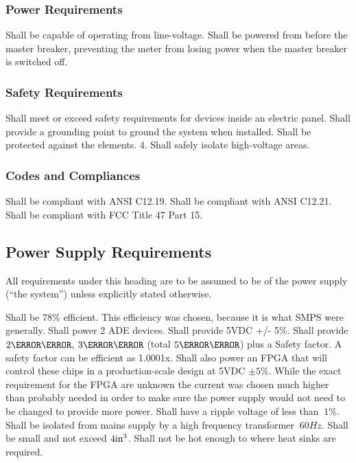 \subsubsection{Power Requirements}
\begin{outline}[enumerate]
\1 Shall be capable of operating from line-voltage.
\1 Shall be powered from before the master breaker, preventing the meter from losing power when the master breaker is switched off.
\end{outline}

\subsubsection{Safety Requirements}
\begin{outline}[enumerate]
\1 Shall meet or exceed safety requirements for devices inside an electric panel. 
\1 Shall provide a grounding point to ground the system when installed. 
\1 Shall be protected against the elements. 4. Shall safely isolate high-voltage areas.
\end{outline}

\subsubsection{Codes and Compliances}
\begin{outline}[enumerate]
\1 Shall be compliant with \ac{ANSI} C12.19.
\1 Shall be compliant with \ac{ANSI} C12.21.
\1 Shall be compliant with \ac{FCC} Title 47 Part 15.
\end{outline}

\subsection{Power Supply Requirements}
All requirements under this heading are to be assumed to be of the power supply (``the system'') unless explicitly stated otherwise.
\begin{outline}[enumerate]
\1 Shall be 78\% efficient.
\2 This efficiency was chosen, because it is what SMPS were generally.
\1 Shall power 2 ADE devices.
\1 Shall provide 5VDC +/- 5\%.
\1 Shall provide $2\milli\ampere$, $3\milli\ampere$ (total $5\milli\ampere$) plus a Safety factor.
\2 A safety factor can be efficient as 1.0001x.
\1 Shall also power an FPGA that will control these chips in a production-scale design at 5VDC $\pm5\%$.
\2 While the exact requirement for the FPGA are unknown the current was chosen much higher than probably needed in order to make sure the power supply would not need to be changed to provide more power.
\1 Shall have a ripple voltage of less than $~1\%$.
\1 Shall be isolated from mains supply by a high frequency transformer $~60Hz$.
\1 Shall be small and not exceed $4\mathrm{in}^3$.
\1 Shall not be hot enough to where heat sinks are required.
\end{outline}

